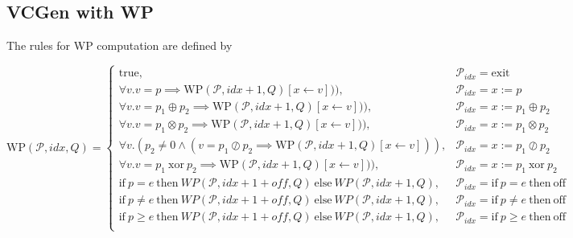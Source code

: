\subsection{VCGen with WP}
\label{subsec:vcgen_wp}

The rules for WP computation are defined by


\[
  \mathrm{WP}(\mathcal{P}, idx, Q) =
  \begin{cases}
    \mathrm{true}, & \mathcal{P}_{idx} = \mathrm{exit} \\
    \forall v . v = p \implies \mathrm{WP}(\mathcal{P}, idx+1, Q)[x \leftarrow v])) , & \mathcal{P}_{idx} = x := p \\    
    \forall v . v = p_1 \oplus p_2 \implies \mathrm{WP}(\mathcal{P}, idx+1, Q)[x \leftarrow v])) , & \mathcal{P}_{idx} = x := p_1 \oplus p_2 \\
    \forall v . v = p_1 \otimes p_2 \implies \mathrm{WP}(\mathcal{P}, idx+1, Q)[x \leftarrow v])) , & \mathcal{P}_{idx} = x := p_1 \otimes p_2 \\    
    \forall v . (p_2  \neq 0 \land (v = p_1 \oslash p_2 \implies \mathrm{WP}(\mathcal{P}, idx+1, Q)[x \leftarrow v])) , & \mathcal{P}_{idx} = x := p_1 \oslash p_2 \\
    \forall v . v = p_1 ~ \mathrm{xor} ~ p_2 \implies \mathrm{WP}(\mathcal{P}, idx+1, Q)[x \leftarrow v])) , & \mathcal{P}_{idx} = x := p_1 ~ \mathrm{xor} ~ p_2 \\
    \mathrm{if} ~ p = e ~ \mathrm{then} ~ WP(\mathcal{P}, idx+1+off, Q) ~ \mathrm{else} ~ WP(\mathcal{P},idx+1, Q) , & \mathcal{P}_{idx} = \mathrm{if} ~ p = e ~ \mathrm{then} ~ \mathrm{off} \\
    \mathrm{if} ~ p \neq e ~ \mathrm{then} ~ WP(\mathcal{P}, idx+1+off, Q) ~ \mathrm{else} ~ WP(\mathcal{P},idx+1, Q) , & \mathcal{P}_{idx} = \mathrm{if} ~ p \neq e ~ \mathrm{then} ~ \mathrm{off} \\    
    \mathrm{if} ~ p \geq e ~ \mathrm{then} ~ WP(\mathcal{P}, idx+1+off, Q) ~ \mathrm{else} ~ WP(\mathcal{P},idx+1, Q) , & \mathcal{P}_{idx} = \mathrm{if} ~ p \geq e ~ \mathrm{then} ~ \mathrm{off} \\    \end{cases}
\]


